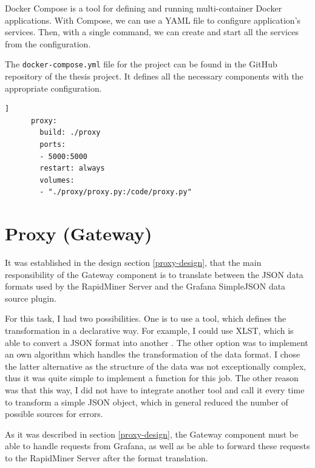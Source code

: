 
Docker Compose is a tool for defining and running multi-container Docker applications. With Compose, we can use a YAML file to configure application’s services. Then, with a single command, we can create and start all the services from the configuration.\cite{docker-compose}

The \texttt{docker-compose.yml} file for the project can be found in the GitHub repository of the thesis project. It defines all the necessary components with the appropriate configuration.

\vspace{0.5cm}
\begin{minipage}{\linewidth}
	\begin{lstlisting}[language=docker-compose-proxy, caption={Extract of the \texttt{docker-compose.yml}}, label={lst:proxy-docker-compose}]]	
	  proxy:
	    build: ./proxy
	    ports:
	    - 5000:5000
	    restart: always
	    volumes: 
	    - "./proxy/proxy.py:/code/proxy.py"
	\end{lstlisting}
\end{minipage}

\section{Proxy (Gateway)} \label{proxy-impl}

It was established in the design section \ref{proxy-design}, that the main responsibility of the Gateway component is to translate between the JSON data formats used by the RapidMiner Server and the Grafana SimpleJSON data source plugin.

For this task, I had two possibilities. One is to use a tool, which defines the transformation in a declarative way. For example, I could use XLST, which is able to convert a JSON format into another \cite{xslt}. The other option was to implement an own algorithm which handles the transformation of the data format. I chose the latter alternative as the structure of the data was not exceptionally complex, thus it was quite simple to implement a function for this job. The other reason was that this way, I did not have to integrate another tool and call it every time to transform a simple JSON object, which in general reduced the number of possible sources for errors.


As it was described in section \ref{proxy-design}, the Gateway component must be able to handle requests from Grafana, as well as be able to forward these requests to the RapidMiner Server after the format translation. 

